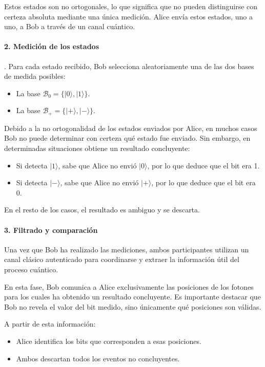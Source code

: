 Estos estados son no ortogonales, lo que significa que no pueden distinguirse con certeza absoluta mediante una única medición. Alice envía estos estados, uno a uno, a Bob a través de un canal cuántico.

\paragraph{2. Medición de los estados}. Para cada estado recibido, Bob selecciona aleatoriamente una de las dos bases de medida posibles:

\begin{itemize}
    \item La base $\mathcal{B}_0 = \{|0\rangle, |1\rangle\}$.
    \item La base $\mathcal{B}_+ = \{|{+}\rangle, |{-}\rangle\}$.
\end{itemize}

Debido a la no ortogonalidad de los estados enviados por Alice, en muchos casos 
Bob no puede determinar con certeza qué estado fue enviado. Sin embargo, en 
determinadas situaciones obtiene un resultado concluyente:

\begin{itemize}
    \item Si detecta $|1\rangle$, sabe que Alice no envió $|0\rangle$, por lo 
    que deduce que el bit era 1.
    \item Si detecta $|{-}\rangle$, sabe que Alice no envió $|{+}\rangle$, por 
    lo que deduce que el bit era 0.
\end{itemize}

En el resto de los casos, el resultado es ambiguo y se descarta.

\paragraph{3. Filtrado y comparación}

Una vez que Bob ha realizado las mediciones, ambos participantes utilizan un canal clásico autenticado para coordinarse y extraer la información útil del proceso cuántico.  
  
En esta fase, Bob comunica a Alice exclusivamente las posiciones de los fotones para los cuales ha obtenido un resultado concluyente. Es importante destacar que Bob no revela el valor del bit medido, sino únicamente qué posiciones son válidas.  
  
A partir de esta información:  
  
\begin{itemize}  
    \item Alice identifica los bits que corresponden a esas posiciones. 
    \item Ambos descartan todos los eventos no concluyentes.  
\end{itemize}  
  
